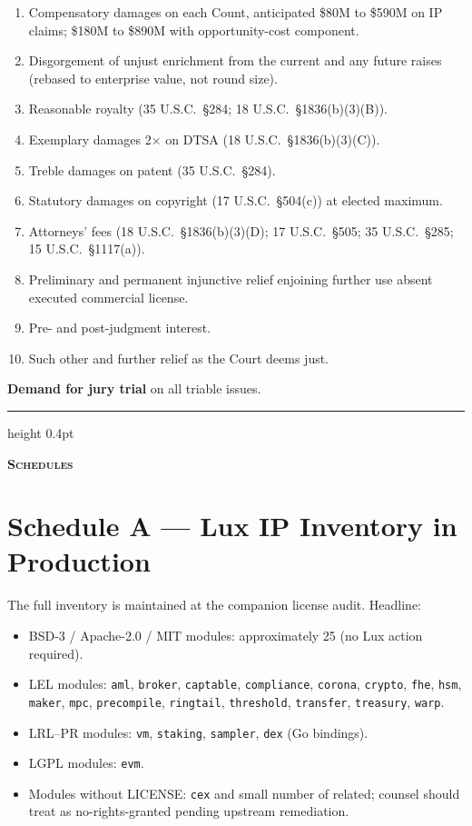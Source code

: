 \documentclass[11pt,letterpaper]{article}
\begin{document}
\begin{enumerate}[leftmargin=1.5em,itemsep=0.1em]
\item Compensatory damages on each Count, anticipated \$80M to \$590M
on IP claims; \$180M to \$890M with opportunity-cost component.
\item Disgorgement of unjust enrichment from the current and any future raises (rebased to enterprise value, not round size).
\item Reasonable royalty (35 U.S.C.\ \S 284; 18 U.S.C.\ \S 1836(b)(3)(B)).
\item Exemplary damages 2$\times$ on DTSA (18 U.S.C.\ \S 1836(b)(3)(C)).
\item Treble damages on patent (35 U.S.C.\ \S 284).
\item Statutory damages on copyright (17 U.S.C.\ \S 504(c)) at elected
maximum.
\item Attorneys' fees (18 U.S.C.\ \S 1836(b)(3)(D); 17 U.S.C.\ \S 505;
35 U.S.C.\ \S 285; 15 U.S.C.\ \S 1117(a)).
\item Preliminary and permanent injunctive relief enjoining further
use absent executed commercial license.
\item Pre- and post-judgment interest.
\item Such other and further relief as the Court deems just.
\end{enumerate}

\textbf{Demand for jury trial} on all triable issues.

\vspace{1em}
\hrule height 0.4pt
\vspace{0.5em}
\begin{center}\textbf{\textsc{Schedules}}\end{center}
\vspace{0.5em}

\section*{Schedule A --- Lux IP Inventory in Production}

The full inventory is maintained at the companion license audit. Headline:

\begin{itemize}[leftmargin=1.5em,itemsep=0.1em]
\item BSD-3 / Apache-2.0 / MIT modules: approximately 25 (no Lux
action required).
\item LEL modules: \texttt{aml}, \texttt{broker}, \texttt{captable},
\texttt{compliance}, \texttt{corona}, \texttt{crypto}, \texttt{fhe},
\texttt{hsm}, \texttt{maker}, \texttt{mpc}, \texttt{precompile},
\texttt{ringtail}, \texttt{threshold}, \texttt{transfer},
\texttt{treasury}, \texttt{warp}.
\item LRL--PR modules: \texttt{vm}, \texttt{staking}, \texttt{sampler},
\texttt{dex} (Go bindings).
\item LGPL modules: \texttt{evm}.
\item Modules without LICENSE: \texttt{cex} and small number of
related; counsel should treat as no-rights-granted pending upstream
remediation.
\end{itemize}
\end{document}
